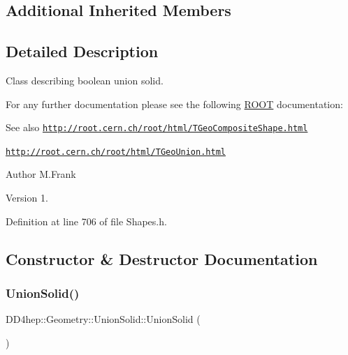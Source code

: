 \subsection*{Additional Inherited Members}


\subsection{Detailed Description}
Class describing boolean union solid. 

For any further documentation please see the following \hyperlink{namespace_r_o_o_t}{R\+O\+OT} documentation\+: \begin{DoxySeeAlso}{See also}
\href{http://root.cern.ch/root/html/TGeoCompositeShape.html}{\tt http\+://root.\+cern.\+ch/root/html/\+T\+Geo\+Composite\+Shape.\+html} 

\href{http://root.cern.ch/root/html/TGeoUnion.html}{\tt http\+://root.\+cern.\+ch/root/html/\+T\+Geo\+Union.\+html}
\end{DoxySeeAlso}
\begin{DoxyAuthor}{Author}
M.\+Frank 
\end{DoxyAuthor}
\begin{DoxyVersion}{Version}
1. 
\end{DoxyVersion}


Definition at line 706 of file Shapes.\+h.



\subsection{Constructor \& Destructor Documentation}
\hypertarget{class_d_d4hep_1_1_geometry_1_1_union_solid_a2f43253eac7e1983c116d8133c1ec30b}{}\label{class_d_d4hep_1_1_geometry_1_1_union_solid_a2f43253eac7e1983c116d8133c1ec30b} 
\subsubsection{\texorpdfstring{Union\+Solid()}{UnionSolid()}\hspace{0.1cm}{\footnotesize\ttfamily [1/8]}}
{\footnotesize\ttfamily D\+D4hep\+::\+Geometry\+::\+Union\+Solid\+::\+Union\+Solid (\begin{DoxyParamCaption}{ }\end{DoxyParamCaption})\hspace{0.3cm}{\ttfamily [default]}}



